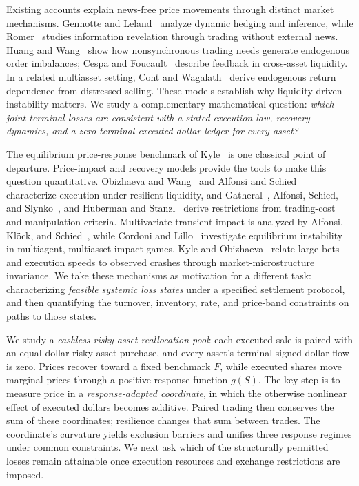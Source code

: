 \documentclass[11pt]{article}
\numberwithin{equation}{section}
\theoremstyle{definition}
\theoremstyle{remark}
\begin{document}
Existing accounts explain news-free price movements through distinct market mechanisms. Gennotte and Leland~\citep{GennotteLeland1990} analyze dynamic hedging and inference, while Romer~\citep{Romer1993} studies information revelation through trading without external news. Huang and Wang~\citep{HuangWang2009} show how nonsynchronous trading needs generate endogenous order imbalances; Cespa and Foucault~\citep{CespaFoucault2014} describe feedback in cross-asset liquidity. In a related multiasset setting, Cont and Wagalath~\citep{ContWagalath2013} derive endogenous return dependence from distressed selling. These models establish why liquidity-driven instability matters. We study a complementary mathematical question: \emph{which joint terminal losses are consistent with a stated execution law, recovery dynamics, and a zero terminal executed-dollar ledger for every asset?}

The equilibrium price-response benchmark of Kyle~\citep{Kyle1985} is one classical point of departure. Price-impact and recovery models provide the tools to make this question quantitative. Obizhaeva and Wang~\citep{ObizhaevaWang2013} and Alfonsi and Schied~\citep{AlfonsiSchied2010} characterize execution under resilient liquidity, and Gatheral~\citep{Gatheral2010}, Alfonsi, Schied, and Slynko~\citep{AlfonsiSchiedSlynko2012}, and Huberman and Stanzl~\citep{HubermanStanzl2004} derive restrictions from trading-cost and manipulation criteria. Multivariate transient impact is analyzed by Alfonsi, Kl\"ock, and Schied~\citep{AlfonsiKlockSchied2016}, while Cordoni and Lillo~\citep{CordoniLillo2024} investigate equilibrium instability in multiagent, multiasset impact games. Kyle and Obizhaeva~\citep{KyleObizhaeva2023} relate large bets and execution speeds to observed crashes through market-microstructure invariance. We take these mechanisms as motivation for a different task: characterizing \emph{feasible systemic loss states} under a specified settlement protocol, and then quantifying the turnover, inventory, rate, and price-band constraints on paths to those states.

We study a \emph{cashless risky-asset reallocation pool}: each executed sale is paired with an equal-dollar risky-asset purchase, and every asset's terminal signed-dollar flow is zero. Prices recover toward a fixed benchmark $F$, while executed shares move marginal prices through a positive response function $g(S)$. The key step is to measure price in a \emph{response-adapted coordinate}, in which the otherwise nonlinear effect of executed dollars becomes additive. Paired trading then conserves the sum of these coordinates; resilience changes that sum between trades. The coordinate's curvature yields exclusion barriers and unifies three response regimes under common constraints. We next ask which of the structurally permitted losses remain attainable once execution resources and exchange restrictions are imposed.
\end{document}

